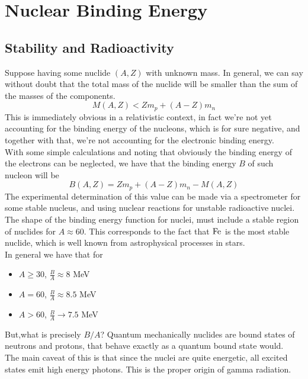 \documentclass[../qm.tex]{subfiles}
\begin{document}
\section{Nuclear Binding Energy}
\subsection{Stability and Radioactivity}
Suppose having some nuclide $(A,Z)$ with unknown mass. In general, we can say without doubt that the total mass of the nuclide will be smaller than the sum of the masses of the components.
\begin{equation*}
	M(A,Z)<Zm_p+(A-Z)m_n
\end{equation*}
This is immediately obvious in a relativistic context, in fact we're not yet accounting for the binding energy of the nucleons, which is for sure negative, and together with that, we're not accounting for the electronic binding energy.\\
With some simple calculations and noting that obviously the binding energy of the electrons can be neglected, we have that the binding energy $B$ of such nucleon will be
\begin{equation}
	B(A,Z)=Zm_p+(A-Z)m_n-M(A,Z)
	\label{eq:nuclearbindingenergy}
\end{equation}
The experimental determination of this value can be made via a spectrometer for some stable nucleus, and using nuclear reactions for unstable radioactive nuclei.\\
The shape of the binding energy function for nuclei, must include a stable region of nuclides for $A\approx60$. This corresponds to the fact that ${}_{}^{}{\mathrm{Fe}}_{}$ is the most stable nuclide, which is well known from astrophysical processes in stars.\\
In general we have that for
\begin{itemize}
\item $A\ge30$, $\frac{B}{A}\approx8$ MeV
\item $A=60$, $\frac{B}{A}\approx8.5$ MeV
\item $A>60$, $\frac{B}{A}\to7.5$ MeV
\end{itemize}
But,what is precisely $B/A$? Quantum mechanically nuclides are bound states of neutrons and protons, that behave exactly as a quantum bound state would.\\
The main caveat of this is that since the nuclei are quite energetic, all excited states emit high energy photons. This is the proper origin of gamma radiation.\\
\end{document}
